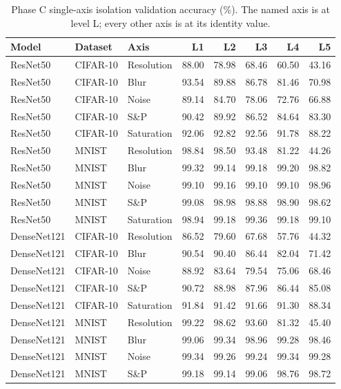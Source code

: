 \begin{table}[htbp]
\centering
\caption{Phase C single-axis isolation validation accuracy (\%). The named axis is at level L; every other axis is at its identity value.}
\label{tab:phase_c}
\setlength{\tabcolsep}{4pt}
\renewcommand{\arraystretch}{1.1}
\begin{tabular}{lllrrrrr}
\toprule
Model & Dataset & Axis & L1 & L2 & L3 & L4 & L5 \\
\midrule
ResNet50 & CIFAR-10 & Resolution & 88.00 & 78.98 & 68.46 & 60.50 & 43.16 \\
ResNet50 & CIFAR-10 & Blur & 93.54 & 89.88 & 86.78 & 81.46 & 70.98 \\
ResNet50 & CIFAR-10 & Noise & 89.14 & 84.70 & 78.06 & 72.76 & 66.88 \\
ResNet50 & CIFAR-10 & S\&P & 90.42 & 89.92 & 86.52 & 84.64 & 83.30 \\
ResNet50 & CIFAR-10 & Saturation & 92.06 & 92.82 & 92.56 & 91.78 & 88.22 \\
ResNet50 & MNIST & Resolution & 98.84 & 98.50 & 93.48 & 81.22 & 44.26 \\
ResNet50 & MNIST & Blur & 99.32 & 99.14 & 99.18 & 99.20 & 98.82 \\
ResNet50 & MNIST & Noise & 99.10 & 99.16 & 99.10 & 99.10 & 98.96 \\
ResNet50 & MNIST & S\&P & 99.08 & 98.98 & 98.88 & 98.90 & 98.62 \\
ResNet50 & MNIST & Saturation & 98.94 & 99.18 & 99.36 & 99.18 & 99.10 \\
DenseNet121 & CIFAR-10 & Resolution & 86.52 & 79.60 & 67.68 & 57.76 & 44.32 \\
DenseNet121 & CIFAR-10 & Blur & 90.54 & 90.40 & 86.44 & 82.04 & 71.42 \\
DenseNet121 & CIFAR-10 & Noise & 88.92 & 83.64 & 79.54 & 75.06 & 68.46 \\
DenseNet121 & CIFAR-10 & S\&P & 90.72 & 88.98 & 87.96 & 86.44 & 85.08 \\
DenseNet121 & CIFAR-10 & Saturation & 91.84 & 91.42 & 91.66 & 91.30 & 88.34 \\
DenseNet121 & MNIST & Resolution & 99.22 & 98.62 & 93.60 & 81.32 & 45.40 \\
DenseNet121 & MNIST & Blur & 99.06 & 99.34 & 98.96 & 99.28 & 98.46 \\
DenseNet121 & MNIST & Noise & 99.34 & 99.26 & 99.24 & 99.34 & 99.28 \\
DenseNet121 & MNIST & S\&P & 99.18 & 99.14 & 99.06 & 98.76 & 98.72 \\

\end{tabular}
\end{table}
